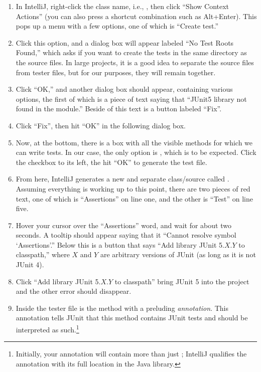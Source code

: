 \begin{enumerate}[label=(\arabic*)]
  \item In IntelliJ, right-click the class name, i.e., , then click ``Show Context Actions'' (you can also press a shortcut combination such as Alt+Enter). 
This pops up a menu with a few options, one of which is ``Create test.''
  \item Click this option, and a dialog box will appear labeled ``No Test Roots Found,'' which asks if you want to create the tests in the same directory as the source files. 
In large projects, it is a good idea to separate the source files from tester files, but for our purposes, they will remain together. 
  \item Click ``OK,'' and another dialog box should appear, containing various options, the first of which is a piece of text saying that ``JUnit5 library not found in the module.'' Beside of this text is a button labeled ``Fix''. 
  \item Click ``Fix'', then hit ``OK'' in the following dialog box. 
  \item Now, at the bottom, there is a box with all the visible methods for which we can write tests. In our case, the only option is , which is to be expected. Click the checkbox to its left, the hit ``OK'' to generate the test file.
  \item From here, IntelliJ generates a new and separate class/source called . 
Assuming everything is working up to this point, there are two pieces of red text, one of which is ``Assertions'' on line one, and the other is ``Test'' on line five. 
  \item Hover your cursor over the ``Assertions'' word, and wait for about two seconds. A tooltip should appear saying that it ``Cannot resolve symbol `Assertions'.'' Below this is a button that says ``Add library JUnit 5.$X$.$Y$ to classpath,'' where $X$ and $Y$ are arbitrary versions of JUnit (as long as it is not JUnit 4). 
  \item Click ``Add library JUnit 5.$X$.$Y$ to classpath'' bring JUnit 5 into the project and the other error should disappear.
  \item Inside the tester file is the  method with a preluding \emph{annotation}. This  annotation tells JUnit that this method contains JUnit tests and should be interpreted as such.\footnote{Initially, your annotation will contain more than just ; IntelliJ qualifies the annotation with its full location in the Java library.} 
\end{enumerate}
